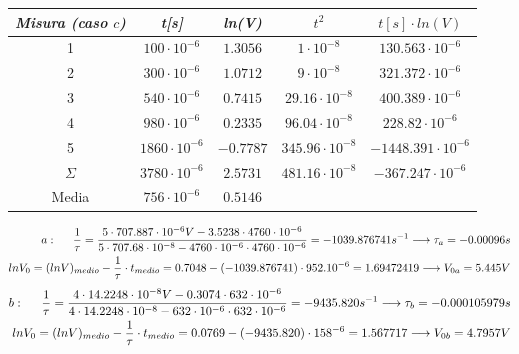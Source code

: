\begin{center}
    \begin{tabular}{|c|c|c|c|c|}
        \hline
        \textit{Misura (caso $c$)} & \textit{t[s]} & \textit{ln(V)} & \textit{$t^2$} & \textit{$t[s] \cdot ln(V)$} \\
        \hline
        1 & $100 \cdot 10^{-6}$ & $1.3056$ & $1 \cdot 10^{-8}$ & $130.563 \cdot 10^{-6}$ \\
        \hline
        2 & $300 \cdot 10^{-6}$ & $1.0712$ & $9 \cdot 10^{-8}$ & $321.372 \cdot 10^{-6}$ \\
        \hline
        3 & $540 \cdot 10^{-6}$ & $0.7415$ & $29.16 \cdot 10^{-8}$ & $400.389 \cdot 10^{-6}$ \\
        \hline
        4 & $980 \cdot 10^{-6}$ & $0.2335$ & $96.04 \cdot 10^{-8}$ & $228.82 \cdot 10^{-6}$ \\
        \hline
        5 & $1860 \cdot 10^{-6}$ & $-0.7787$ & $345.96 \cdot 10^{-8}$ & $-1448.391 \cdot 10^{-6}$ \\
        \hline
        $\varSigma$ & $3780 \cdot 10^{-6}$ & $2.5731$ & $481.16 \cdot 10^{-8}$ & $-367.247 \cdot 10^{-6}$ \\
        \hline
        Media & $756 \cdot 10^{-6}$ & $0.5146$ & \multicolumn{2}{c}{} \\
        \hline
    \end{tabular}
    \begin{equation}
        \begin{split}
            a: \hspace{0.5 cm}\frac{1}{\tau} = \frac{5 \cdot 707.887\cdot10^{-6}V - 3.5238\cdot4760\cdot10^{-6}}{5\cdot707.68\cdot10^{-8} - 4760\cdot10^{-6}\cdot4760\cdot10^{-6}}
            = -1039.876741s^{-1} \longrightarrow \tau_a = -0.00096s
            \\
            ln{V_0} = (ln{V})_{medio} - \frac{1}{\tau}\cdot t_{medio} = 0.7048 - (-1039.876741)\cdot952.10^{-6} = 1.69472419 \longrightarrow V_{0a} = 5.445V
        \end{split}
    \end{equation}
    \begin{equation}
        \begin{split}
            b : \hspace{0.5 cm}\frac{1}{\tau} = \frac{4 \cdot 14.2248\cdot10^{-8}V - 0.3074\cdot632\cdot10^{-6}}{4\cdot14.2248\cdot10^{-8} - 632\cdot10^{-6}\cdot632\cdot10^{-6}}
            = -9435.820s^{-1} \longrightarrow \tau_b = -0.000105979s
            \\
            ln{V_0} = (ln{V})_{medio} - \frac{1}{\tau}\cdot t_{medio} = 0.0769 - (-9435.820)\cdot158^{-6} = 1.567717 \longrightarrow V_{0b} = 4.7957V

\end{split}
\end{equation}
\end{center}
